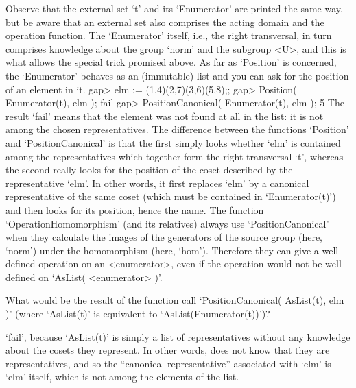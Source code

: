%
Observe  that the external set `t'  and  its `Enumerator' are printed the
same way, but  be aware that an   external set also comprises  the acting
domain  and the operation function.  The  `Enumerator' itself, i.e.,  the
right transversal, in turn comprises knowledge about the group `norm' and
the  subgroup <U>,  and  this is what  allows  the special trick promised
above. As far as `Position' is  concerned, the `Enumerator' behaves as an
(immutable) list and you can ask for the position of an element in it.
\beginexample
    gap> elm := (1,4)(2,7)(3,6)(5,8);;
    gap> Position( Enumerator(t), elm );
    fail
    gap> PositionCanonical( Enumerator(t), elm );
    5
\endexample
{}%
The result `fail'   means that the element was   not found at  all in the
list: it is not among the chosen  representatives. The difference between
the functions `Position' and `PositionCanonical' is that the first simply
looks whether `elm' is contained among the representatives which together
form the  right transversal `t', whereas  the second really looks for the
position of the  coset described by  the  representative `elm'. In  other
words, it first replaces `elm' by a  canonical representative of the same
coset (which must be contained in `Enumerator(t)') and then looks for its
position, hence the name. The  function `OperationHomomorphism' (and  its
relatives) always use  `PositionCanonical' when they calculate the images
of   the  generators of  the    source  group (here,  `norm')   under the
homomorphism  (here, `hom').  Therefore  they  can  give a   well-defined
operation on an   <enumerator>, even   if the   operation  would not   be
well-defined on `AsList( <enumerator> )'.

\exercise   What   would     be  the  result    of   the  function   call
`PositionCanonical( AsList(t), elm )' (where `AsList(t)' is equivalent to
`AsList(Enumerator(t))')?

\answer `fail', because `AsList(t)'  is simply a list of  representatives
without  any knowledge about the  cosets  they represent. In other words,
{\GAP}    does not  know  that  they   are   representatives, and so  the
``canonical representative'' associated with `elm' is `elm' itself, which
is not among the elements of the list.

